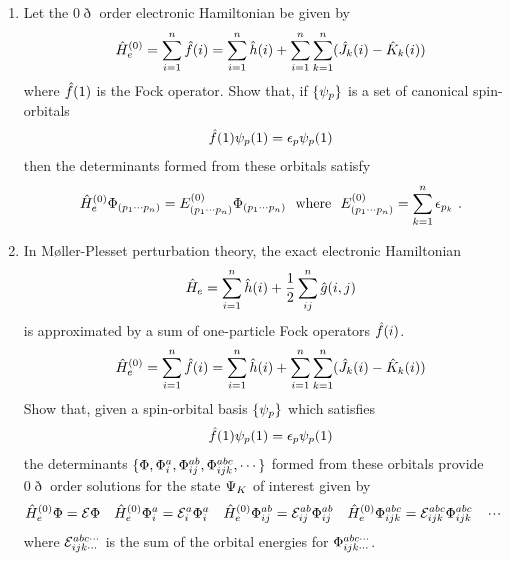 \documentclass[fleqn,11pt]{article}
\begin{document}
\begin{enumerate}
\item
Let the $0\eth$ order electronic Hamiltonian be given by
\begin{align*}
&&
  \hat{H}_e^{(0)}
=
  \sum_{i=1}^n
  \hat{f}(i)
=
  \sum_{i=1}^n
  \hat{h}(i)
+
  \sum_{i=1}^n
  \sum_{k=1}^n
  (\hat{J}_k(i)-\hat{K}_k(i))
\end{align*}
where $\hat{f}(1)$ is the Fock operator.
Show that, if $\{\psi_p\}$ is a set of canonical spin-orbitals
\begin{align*}
&&
  \hat{f}(1)\psi_p(1)
= 
  \epsilon_p\psi_p(1)
\end{align*}
then the determinants formed from these orbitals satisfy
\begin{align*}
&&
  \hat{H}_e^{(0)}
  \Phi_{(p_1\cdots p_n)}
=
  E_{(p_1\cdots p_n)}^{(0)}
  \Phi_{(p_1\cdots p_n)}
\
  \text{ where }
\
  E_{(p_1\cdots p_n)}^{(0)}
=
  \sum_{k=1}^n \epsilon_{p_k}\ .
\end{align*}

\item In M\o ller-Plesset perturbation theory, the exact electronic Hamiltonian
\begin{align*}
&&
  \hat{H}_e
=
  \sum_{i=1}^n
  \hat{h}(i)
+
  \dfrac{1}{2}
  \sum_{ij}^n
  \hat{g}(i,j)
\end{align*}
is approximated by a sum of one-particle Fock operators $\hat{f}(i)$.
\begin{align*}
&&
  \hat{H}_e^{(0)}
=
  \sum_{i=1}^n
  \hat{f}(i)
=
  \sum_{i=1}^n
  \hat{h}(i)
+
  \sum_{i=1}^n
  \sum_{k=1}^n
  (\hat{J}_k(i)-\hat{K}_k(i))
\end{align*}
Show that, given a spin-orbital basis $\{\psi_p\}$ which satisfies 
\begin{align}
&&
  \hat{f}(1)\psi_p(1)
=
  \epsilon_p\psi_p(1)
\end{align}
the determinants $\{\Phi,\Phi_i^a,\Phi_{ij}^{ab},\Phi_{ijk}^{abc},\cdots\}$ formed from these orbitals provide $0\eth$ order solutions for the state $\Psi_K$ of interest given by
\begin{align}
&
  \hat{H}_e^{(0)}\Phi
=
  \mathcal{E}\Phi
&&
  \hat{H}_e^{(0)}\Phi_i^a
=
  \mathcal{E}_i^a\Phi_i^a
&&
  \hat{H}_e^{(0)}\Phi_{ij}^{ab}
=
  \mathcal{E}_{ij}^{ab}\Phi_{ij}^{ab}
&&
  \hat{H}_e^{(0)}\Phi_{ijk}^{abc}
=
  \mathcal{E}_{ijk}^{abc}\Phi_{ijk}^{abc}
&&
  \mathinner{\mkern-1mu\cdotp\mkern-2mu\cdotp\mkern-2mu\cdotp\mkern-1mu}
\end{align}
where $\mathcal{E}_{ijk\cdots}^{abc\cdots}$ is the sum of the orbital energies for $\Phi_{ijk\cdots}^{abc\cdots}$.
\end{enumerate}
\end{document}
